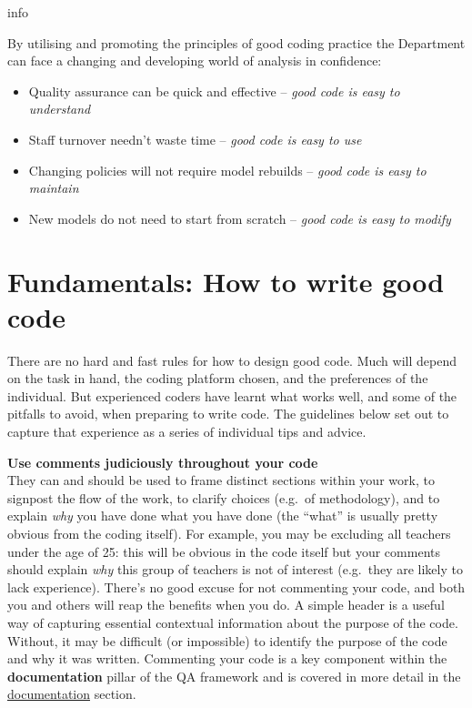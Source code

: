 \documentclass[
]{book}
\providecommand{\tightlist}{%
  \setlength{\itemsep}{0pt}\setlength{\parskip}{0pt}}
\begin{document}
\begin{infoboxblue}info

By utilising and promoting the principles of good coding practice the Department can face a changing and developing world of analysis in confidence:

\begin{itemize}
\tightlist
\item
  Quality assurance can be quick and effective -- \emph{good code is easy to understand}
\item
  Staff turnover needn't waste time -- \emph{good code is easy to use}
\item
  Changing policies will not require model rebuilds -- \emph{good code is easy to maintain}
\item
  New models do not need to start from scratch -- \emph{good code is easy to modify}
\end{itemize}

\end{infoboxblue}

\hypertarget{fundamentals}{%
\chapter{Fundamentals: How to write good code}\label{fundamentals}}

There are no hard and fast rules for how to design good code. Much will depend on the task in hand, the coding platform chosen, and the preferences of the individual. But experienced coders have learnt what works well, and some of the pitfalls to avoid, when preparing to write code. The guidelines below set out to capture that experience as a series of individual tips and advice.

\textbf{Use comments judiciously throughout your code}\\
They can and should be used to frame distinct sections within your work, to signpost the flow of the work, to clarify choices (e.g.~of methodology), and to explain \emph{why} you have done what you have done (the ``what'' is usually pretty obvious from the coding itself). For example, you may be excluding all teachers under the age of 25: this will be obvious in the code itself but your comments should explain \emph{why} this group of teachers is not of interest (e.g.~they are likely to lack experience). There's no good excuse for not commenting your code, and both you and others will reap the benefits when you do. A simple header is a useful way of capturing essential contextual information about the purpose of the code. Without, it may be difficult (or impossible) to identify the purpose of the code and why it was written. Commenting your code is a key component within the \textbf{documentation} pillar of the QA framework and is covered in more detail in the \protect\hyperlink{documentation}{documentation} section.
\end{document}

